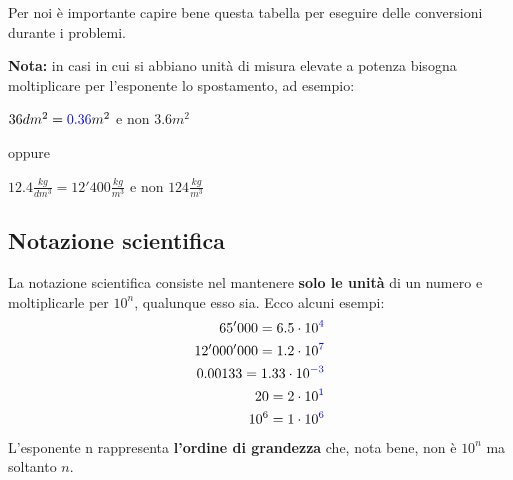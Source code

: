 \documentclass[../main.tex]{subfiles}
\begin{document}
Per noi è importante capire bene questa tabella per eseguire delle conversioni durante i problemi.

\textbf{Nota: }in casi in cui si abbiano unità di misura elevate a potenza bisogna moltiplicare per l'esponente lo spostamento, ad esempio:

\begin{center}
    $36dm^2 = \color{blue} 0.36\color{black}m^2$ e non $3.6m^2$   
\end{center}
oppure
\begin{center}
        $12.4\frac{kg}{dm^3}=12'400\frac{kg}{m^3}$ e non $124\frac{kg}{m^3}$
\end{center}

\subsection{Notazione scientifica}
La notazione scientifica consiste nel mantenere \textbf{solo le unità} di un numero e moltiplicarle per $10^n$, qualunque esso sia. Ecco alcuni esempi:
\begin{align*}
    65'000=6.5\cdot10^{\color{blue}4} \color{black} \\
    12'000'000=1.2\cdot10^{\color{blue}7} \color{black} \\
    0.00133=1.33\cdot10^{\color{blue}-3} \color{black} \\
    20=2\cdot10^{\color{blue}1} \color{black} \\
    10^6=1\cdot10^{\color{blue}6} \color{black}
\end{align*}
L'esponente \color{blue}n \color{black}rappresenta \textbf{l'ordine di grandezza} che, nota bene, non è $10^n$ ma soltanto $n$.
\vspace{1cm}
\end{document}
